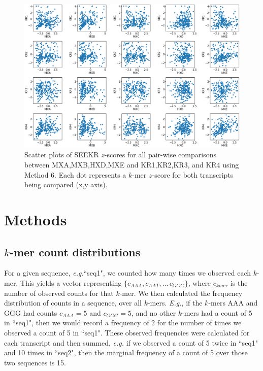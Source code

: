 \begin{figure}[h]
\centering
\includegraphics[width=\textwidth]{images/9_figs.pdf}
\caption{Scatter plots of SEEKR $z$-scores for all pair-wise comparisons between MXA,MXB,HXD,MXE and KR1,KR2,KR3, and KR4 using Method 6. Each dot represents a $k$-mer $z$-score for both transcripts being compared (x,y axis).}
\label{fig:9plots}
\end{figure}

\clearpage

\section{Methods}

\subsection{$k$-mer count distributions}

For a given sequence, \emph{e.g.}``seq1", we counted how many times we observed each $k$-mer. This yields a vector representing $\{c_{AAA},c_{AAT},\dots\,c_{GGG}\}$, where $c_{kmer}$ is the number of observed counts for that $k$-mer. We then calculated the frequency distribution of counts in a sequence, over all $k$-mers. \emph{E.g.}, if the $k$-mers AAA and GGG had counts $c_{AAA} = 5$ and $c_{GGG} = 5$, and no other $k$-mers had a count of 5 in ``seq1", then we would record a frequency of 2 for the number of times we observed a count of 5 in ``seq1". These observed frequencies were calculated for each transcript and then summed, \emph{e.g.} if we observed a count of 5 twice in ``seq1" and 10 times in ``seq2", then the marginal frequency of a count of 5 over those two sequences is 15.

